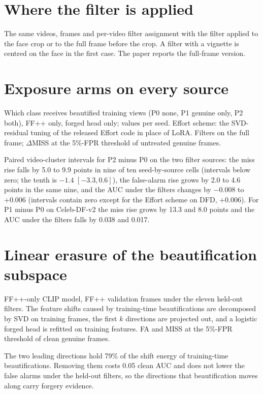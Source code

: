 \documentclass[10pt]{article}
\begin{document}
\section{Where the filter is applied}
\begin{table}[h]
\centering
\caption{The same videos, frames and per-video filter assignment with the filter applied to the face crop or to the full
frame before the crop. A filter with a vignette is centred on the face in the first case. The paper reports the
full-frame version.}
\label{tab:fullframe}
\footnotesize
\begin{adjustbox}{max width=\linewidth}\end{adjustbox}
\end{table}

\section{Exposure arms on every source}
\begin{table}[h]
\centering
\caption{Which class receives beautified training views (P0 none, P1 genuine only, P2 both), FF++ only, forged head
only; values per seed. Effort scheme: the SVD-residual tuning of the released Effort code in place of LoRA. Filters on
the full frame; $\Delta$MISS at the 5\%-FPR threshold of untreated genuine frames.}
\label{tab:exposure_ext}
\footnotesize
\begin{adjustbox}{max width=\linewidth}\end{adjustbox}
\end{table}
Paired video-cluster intervals for P2 minus P0 on the two filter sources: the miss rise falls by 5.0 to 9.9 points in nine
of ten seed-by-source cells (intervals below zero; the tenth is $-1.4$ $[-3.3, 0.6]$), the false-alarm rise grows by 2.0
to 4.6 points in the same nine, and the AUC under the filters changes by $-0.008$ to $+0.006$ (intervals contain zero
except for the Effort scheme on DFD, $+0.006$). For P1 minus P0 on Celeb-DF-v2 the miss rise grows by 13.3 and 8.0 points
and the AUC under the filters falls by 0.038 and 0.017.

\section{Linear erasure of the beautification subspace}
\begin{table}[h]
\centering
\caption{FF++-only CLIP model, FF++ validation frames under the eleven held-out filters. The feature shifts caused by
training-time beautifications are decomposed by SVD on training frames, the first $k$ directions are projected out, and a
logistic forged head is refitted on training features. FA and MISS at the 5\%-FPR threshold of clean genuine frames.}
\label{tab:erasure}
\footnotesize

\end{table}
The two leading directions hold 79\% of the shift energy of training-time beautifications. Removing them costs 0.05
clean AUC and does not lower the false alarms under the held-out filters, so the directions that beautification moves
along carry forgery evidence.
\end{document}
